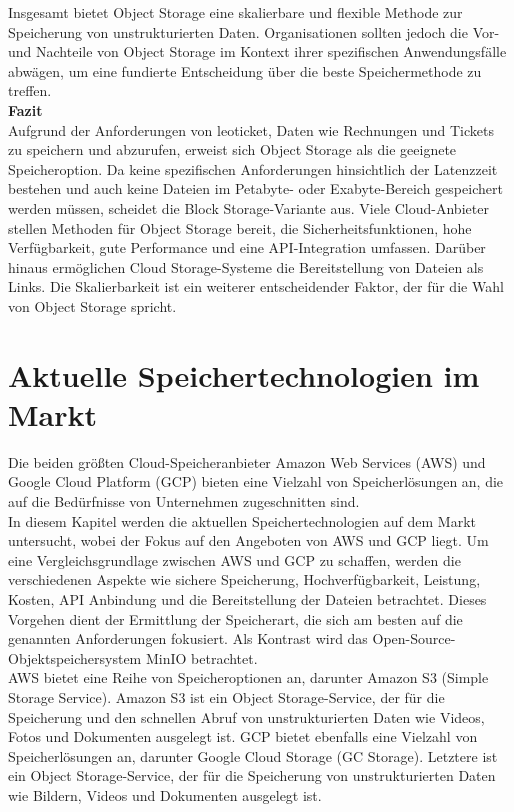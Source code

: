 Insgesamt bietet Object Storage eine skalierbare und flexible Methode zur Speicherung von unstrukturierten Daten. Organisationen sollten jedoch die Vor- und Nachteile von Object Storage im Kontext ihrer spezifischen Anwendungsfälle abwägen, um eine fundierte Entscheidung über die beste Speichermethode zu treffen.\\


\textbf{Fazit}\\

Aufgrund der Anforderungen von leoticket, Daten wie Rechnungen und Tickets zu speichern und abzurufen, erweist sich Object Storage als die geeignete Speicheroption. Da keine spezifischen Anforderungen hinsichtlich der Latenzzeit bestehen und auch keine Dateien im Petabyte- oder Exabyte-Bereich gespeichert werden müssen, scheidet die Block Storage-Variante aus. Viele Cloud-Anbieter stellen Methoden für Object Storage bereit, die Sicherheitsfunktionen, hohe Verfügbarkeit, gute Performance und eine API-Integration umfassen. Darüber hinaus ermöglichen Cloud Storage-Systeme die Bereitstellung von Dateien als Links. Die Skalierbarkeit ist ein weiterer entscheidender Faktor, der für die Wahl von Object Storage spricht.

\newpage

\section{Aktuelle Speichertechnologien im Markt}

Die beiden größten Cloud-Speicheranbieter Amazon Web Services (AWS) und Google Cloud Platform (GCP) bieten eine Vielzahl von Speicherlösungen an, die auf die Bedürfnisse von Unternehmen zugeschnitten sind.\\ 

In diesem Kapitel werden die aktuellen Speichertechnologien auf dem Markt untersucht, wobei der Fokus auf den Angeboten von AWS und GCP liegt. Um eine Vergleichsgrundlage zwischen AWS und GCP zu schaffen, werden die verschiedenen Aspekte wie sichere Speicherung, Hochverfügbarkeit, Leistung, Kosten, API Anbindung und die Bereitstellung der Dateien betrachtet. Dieses Vorgehen dient der Ermittlung der Speicherart, die sich am besten auf die genannten Anforderungen fokusiert. Als Kontrast wird das Open-Source-Objektspeichersystem MinIO betrachtet.\\

AWS bietet eine Reihe von Speicheroptionen an, darunter Amazon S3 (Simple Storage Service). Amazon S3 ist ein Object Storage-Service, der für die Speicherung und den schnellen Abruf von unstrukturierten Daten wie Videos, Fotos und Dokumenten ausgelegt ist. GCP bietet ebenfalls eine Vielzahl von Speicherlösungen an, darunter Google Cloud Storage (GC Storage). Letztere ist ein Object Storage-Service, der für die Speicherung von unstrukturierten Daten wie Bildern, Videos und Dokumenten ausgelegt ist.\\
 
